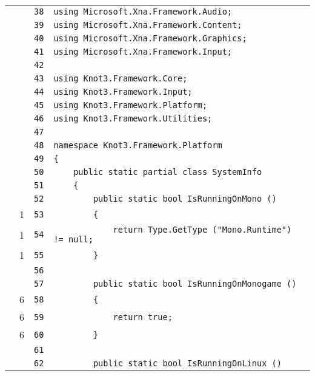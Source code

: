 \documentclass[a4paper,10pt]{article}
\begin{document}
\begin{longtable}[l]{lrrl}
\cellcolor{gray} &  & \verb~38~ & \verb~using Microsoft.Xna.Framework.Audio;~\\
\cellcolor{gray} &  & \verb~39~ & \verb~using Microsoft.Xna.Framework.Content;~\\
\cellcolor{gray} &  & \verb~40~ & \verb~using Microsoft.Xna.Framework.Graphics;~\\
\cellcolor{gray} &  & \verb~41~ & \verb~using Microsoft.Xna.Framework.Input;~\\
\cellcolor{gray} &  & \verb~42~ & \verb~~\\
\cellcolor{gray} &  & \verb~43~ & \verb~using Knot3.Framework.Core;~\\
\cellcolor{gray} &  & \verb~44~ & \verb~using Knot3.Framework.Input;~\\
\cellcolor{gray} &  & \verb~45~ & \verb~using Knot3.Framework.Platform;~\\
\cellcolor{gray} &  & \verb~46~ & \verb~using Knot3.Framework.Utilities;~\\
\cellcolor{gray} &  & \verb~47~ & \verb~~\\
\cellcolor{gray} &  & \verb~48~ & \verb~namespace Knot3.Framework.Platform~\\
\cellcolor{gray} &  & \verb~49~ & \verb~{~\\
\cellcolor{gray} &  & \verb~50~ & \verb~    public static partial class SystemInfo~\\
\cellcolor{gray} &  & \verb~51~ & \verb~    {~\\
\cellcolor{gray} &  & \verb~52~ & \verb~        public static bool IsRunningOnMono ()~\\
\cellcolor{green} & 1 & \verb~53~ & \verb~        {~\\
\cellcolor{green} & 1 & \verb~54~ & \verb~            return Type.GetType ("Mono.Runtime") != null;~\\
\cellcolor{green} & 1 & \verb~55~ & \verb~        }~\\
\cellcolor{gray} &  & \verb~56~ & \verb~~\\
\cellcolor{gray} &  & \verb~57~ & \verb~        public static bool IsRunningOnMonogame ()~\\
\cellcolor{green} & 6 & \verb~58~ & \verb~        {~\\
\cellcolor{green} & 6 & \verb~59~ & \verb~            return true;~\\
\cellcolor{green} & 6 & \verb~60~ & \verb~        }~\\
\cellcolor{gray} &  & \verb~61~ & \verb~~\\
\cellcolor{gray} &  & \verb~62~ & \verb~        public static bool IsRunningOnLinux ()~\\

\end{longtable}
\end{document}

